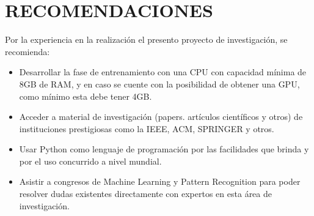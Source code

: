 \chapter*{RECOMENDACIONES}

Por la experiencia en la realización el presento proyecto de investigación, se
recomienda:

\begin{itemize}
\item Desarrollar la fase de entrenamiento con una CPU con capacidad mínima de 8GB
de RAM, y en caso se cuente con la posibilidad de obtener una GPU, como
mínimo esta debe tener 4GB.

\item Acceder a material de investigación (papers. artículos científicos y otros) de
instituciones prestigiosas como la IEEE, ACM, SPRINGER y otros.

\item Usar Python como lenguaje de programación por las facilidades que brinda y por
el uso concurrido a nivel mundial.

\item Asistir a congresos de Machine Learning y Pattern Recognition para poder
resolver dudas existentes directamente con expertos en esta área de investigación.

\end{itemize}